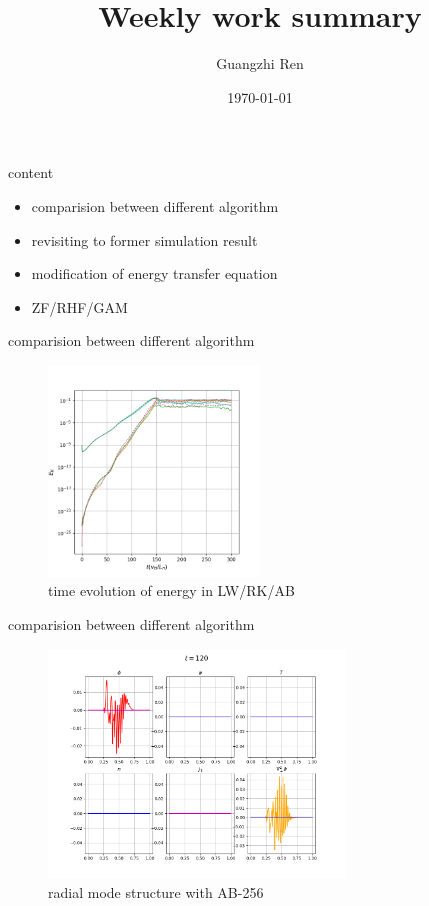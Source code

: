 \documentclass{beamer}
\title{Weekly work summary}
\author{Guangzhi Ren}
\institute {}
\date{\today}
\begin{document}
\begin{frame}
\titlepage   
\end{frame}

\begin{frame}{content}
	\begin{itemize}
		\item comparision between different algorithm
		\item revisiting to former simulation result
		\item modification of energy transfer equation 
		\item ZF/RHF/GAM	
\end{itemize}
\end{frame}


%
%	
	

\begin{frame}{comparision between different algorithm}
\begin{figure}[H]
	\centering
	\includegraphics[width=0.5\textwidth]{../ek-256.png}
	\caption{time evolution of energy in LW/RK/AB}
\end{figure}
\end{frame}	
	
\begin{frame}{comparision between different algorithm}
\begin{figure}[H]
	\centering
	\includegraphics[width=0.7\textwidth]{../ab-256-120.png}
	\caption{radial mode structure with AB-256}
\end{figure}
\end{frame}	
\end{document}
